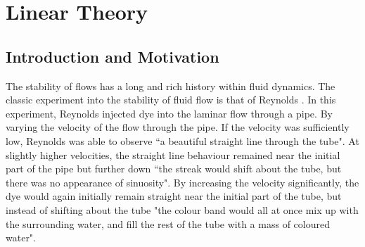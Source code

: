 \chapter{Linear Theory}

\section{Introduction and Motivation}
The stability of flows has a long and rich history within fluid dynamics. The classic experiment into the stability of fluid flow is that of  Reynolds \cite{reynolds1883}. In this experiment, Reynolds injected dye into the laminar flow through a pipe. By varying the velocity of the flow through the pipe. If the velocity was sufficiently low, Reynolds was able to observe ``a beautiful straight line through the tube". At slightly higher velocities, the straight line behaviour remained near the initial part of the pipe but further down ``the streak would shift about the tube, but there was no appearance of sinuosity". By increasing the velocity significantly, the dye would again initially remain straight near the initial part of the tube, but instead of shifting about the tube "the colour band would all at once mix up with the surrounding water, and fill the rest of the tube with a mass of coloured water". 

